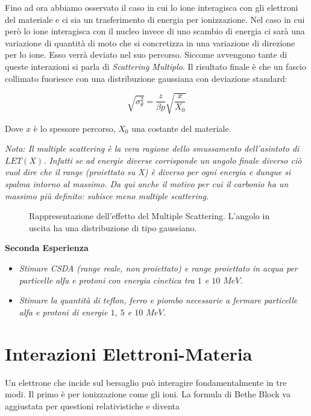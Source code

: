 Fino ad ora abbiamo osservato il caso in cui lo ione interagisca con gli elettroni del materiale e ci sia un trasferimento di energia per ionizzazione.
Nel caso in cui però lo ione interagisca con il nucleo invece di uno scambio di energia ci sarà una variazione di quantità di moto che si concretizza in una variazione di direzione per lo ione. Esso verrà deviato nel suo percorso. Siccome avvengono tante di queste interazioni si parla di \emph{Scattering Multiplo}. 
Il risultato finale è che un fascio collimato fuoriesce con una distribuzione gaussiana con deviazione standard:

\begin{equation}
\sqrt{\sigma_{\theta}^2}=\frac{z}{\beta p}\sqrt{\frac{x}{X_0}}
\end{equation}

Dove $x$ è lo spessore percorso, $X_0$ una costante del materiale.

\emph{Nota: Il multiple scattering è la vera ragione dello smussamento dell'asintoto di $LET(X)$. Infatti se ad energie diverse corrisponde un angolo finale diverso ciò vuol dire che il range (proiettato su X) è diverso per ogni energia e dunque si spalma intorno al massimo. Da qui anche il motivo per cui il carbonio ha un massimo più definito: subisce meno multiple scattering.}

\begin{figure}
\centering
	\caption{Rappresentazione dell'effetto del Multiple Scattering. L'angolo in uscita ha una distribuzione di tipo gaussiano.}
	\label{multiplescattering}
\end{figure}

\textbf{Seconda Esperienza}

\begin{itemize}
\item \emph{Stimare CSDA (range reale, non proiettato) e range proiettato in acqua per particelle alfa e protoni con energia cinetica tra $1$ e $10$ $MeV$.}
\item \emph{Stimare la quantità di teflon, ferro e piombo necessarie a fermare particelle alfa e protoni di energie $1$, $5$ e $10$ $MeV$.}
\end{itemize}

\section{Interazioni Elettroni-Materia}

Un elettrone che incide sul bersaglio può interagire fondamentalmente in tre modi. Il primo è per ionizzazione come gli ioni. La formula di Bethe Block va aggiustata per questioni relativistiche e diventa

